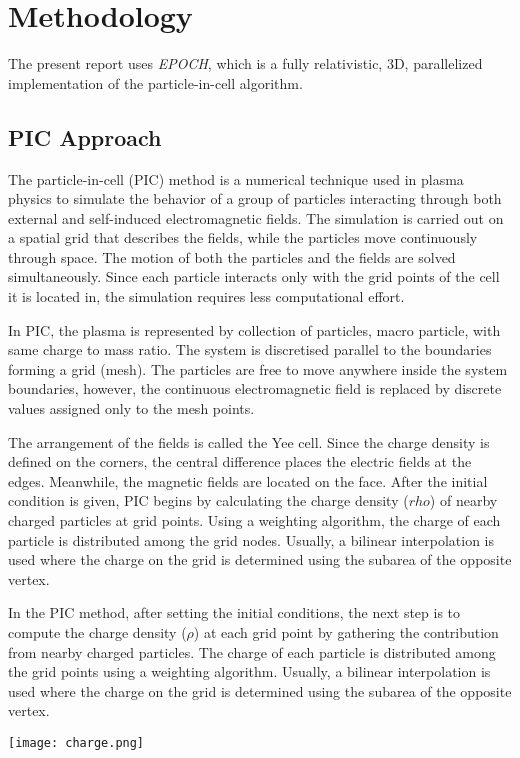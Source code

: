 \section{Methodology}

The present report uses \textit{EPOCH}\cite{EPOCH}, which is a fully relativistic, 3D, parallelized implementation of the particle-in-cell algorithm.

\subsection{PIC Approach}
The particle-in-cell (PIC) method is a numerical technique used in plasma physics to simulate the behavior of a group of particles interacting through both external and self-induced electromagnetic fields. The simulation is carried out on a spatial grid that describes the fields, while the particles move continuously through space. The motion of both the particles and the fields are solved simultaneously. Since each particle interacts only with the grid points of the cell it is located in, the simulation requires less computational effort. \cite{suciu}

In PIC, the plasma is represented by collection of particles, macro particle, with same charge to mass ratio. The system is discretised parallel to the boundaries forming a grid (mesh). The particles are free to move anywhere inside the system boundaries, however, the continuous electromagnetic field is replaced by discrete values assigned only to the mesh points.

The arrangement of the fields is called the Yee cell. Since the charge density is defined on the corners, the central difference places the electric fields at the edges. Meanwhile, the magnetic fields are located on the face. After the initial condition is given, PIC begins by calculating the charge density ($rho$) of nearby charged particles at grid points. Using a weighting algorithm, the charge of each particle is distributed among the grid nodes. Usually, a bilinear interpolation is used where the charge on the grid is determined using the subarea of the opposite vertex.

\begin{minipage}{0.50\textwidth}\raggedright
    In the PIC method, after setting the initial conditions, the next step is to compute the charge density ($\rho$) at each grid point by gathering the contribution from nearby charged particles. The charge of each particle is distributed among the grid points using a weighting algorithm. Usually, a bilinear interpolation is used where the charge on the grid is determined using the subarea of the opposite vertex.
\end{minipage}
\begin{minipage}{0.45\textwidth}\raggedleft
    \texttt{[image: charge.png]}
\end{minipage}

